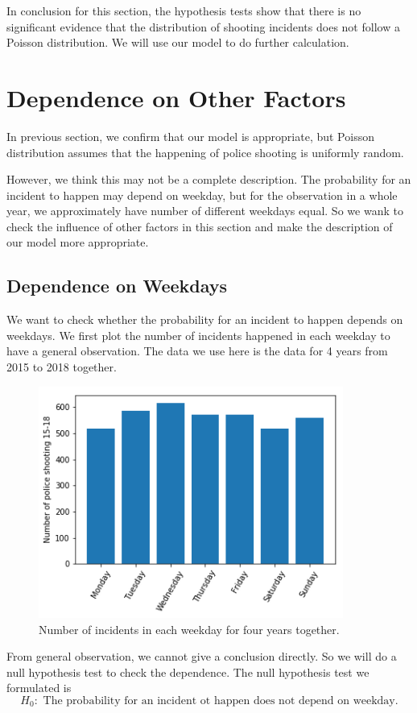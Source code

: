 \documentclass[11pt,a4paper,english]{article}
\begin{document}
In conclusion for this section, the hypothesis tests show that there is no significant evidence that the distribution of shooting incidents does not follow a Poisson distribution. We will use our model to do further calculation.
\section{Dependence on Other Factors}
In previous section, we confirm that our model is appropriate, but Poisson distribution assumes that the happening of police shooting is uniformly random. 

However, we think this may not be a complete description. 
The probability for an incident to happen may depend on weekday, but for the observation in a whole year, we approximately have number of different weekdays equal. 
So we wank to check the influence of other factors in this section and make the description of our model more appropriate. 
\subsection{Dependence on Weekdays}
We want to check whether the probability for an incident to happen depends on weekdays. We first plot the number of incidents happened in each weekday to have a general observation. The data we use here is the data for 4 years from 2015 to 2018 together.
\begin{figure}[htbp]
	\centering
	\includegraphics[width = 10cm]{weekdays.png}
	\caption{Number of incidents in each weekday for four years together.}
\end{figure}

From general observation, we cannot give a conclusion directly. So we will do a null hypothesis test to check the dependence. The null hypothesis test we formulated is 
\[H_{0}:\text{ The probability for an incident ot happen does not depend on weekday.}\]
\end{document}
